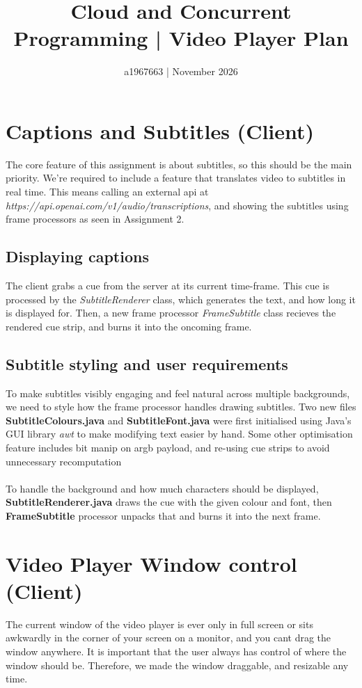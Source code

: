 \documentclass{article}
\title{Cloud and Concurrent Programming | Video Player Plan}
\author{a1967663 | November 2026}
\date{}
\begin{document}
\maketitle

\section*{Captions and Subtitles (Client)}
The core feature of this assignment is about subtitles, so this should be the main priority. We're required to include a feature that translates video to subtitles in real time. This means calling an external api at \textit{https://api.openai.com/v1/audio/transcriptions}, and showing the subtitles using frame processors as seen in Assignment 2.

\subsection*{Displaying captions}
The client grabs a cue from the server at its current time-frame. This cue is processed by the \textit{SubtitleRenderer} class, which generates the text, and how long it is displayed for. Then, a new frame processor \textit{FrameSubtitle} class recieves the rendered cue strip, and burns it into the oncoming frame.

\subsection*{Subtitle styling and user requirements}
To make subtitles visibly engaging and feel natural across multiple backgrounds, we need to style how the frame processor handles drawing subtitles. Two new files \textbf{SubtitleColours.java} and \textbf{SubtitleFont.java} were first initialised using Java's GUI library \textit{awt} to make modifying text easier by hand. Some other optimisation feature includes bit manip on argb payload, and re-using cue strips to avoid unnecessary recomputation
\\\\
To handle the background and how much characters should be displayed, \textbf{SubtitleRenderer.java} draws the cue with the given colour and font, then \textbf{FrameSubtitle} processor unpacks that and burns it into the next frame.

\section*{Video Player Window control (Client)}
The current window of the video player is ever only in full screen or sits awkwardly in the corner of your screen on a monitor, and you cant drag the window anywhere. It is important that the user always has control of where the window should be. Therefore, we made the window draggable, and resizable any time.
\end{document}

